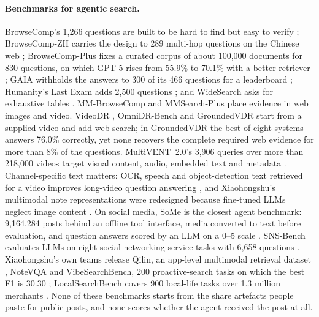 \documentclass[11pt]{article}
\begin{document}
\paragraph{Benchmarks for agentic search.}
BrowseComp's 1{,}266 questions are built to be hard to find but easy to verify \citep{wei2025browsecomp};
BrowseComp-ZH carries the design to 289 multi-hop questions on the Chinese web \citep{zhou2025browsecompzh};
BrowseComp-Plus fixes a curated corpus of about 100{,}000 documents for 830 questions, on which GPT-5 rises
from 55.9\% to 70.1\% with a better retriever \citep{chen2025browsecompplus}; GAIA withholds the answers to
300 of its 466 questions for a leaderboard \citep{mialon2023gaia}; Humanity's Last Exam adds 2{,}500
questions \citep{phan2025hle}; and WideSearch asks for exhaustive tables \citep{wong2025widesearch}.
MM-BrowseComp \citep{li2025mmbrowsecomp} and MMSearch-Plus \citep{tao2025mmsearchplus} place evidence in web
images and video. VideoDR \citep{liu2026videodr}, OmniDR-Bench \citep{meng2026omnidr} and GroundedVDR
\citep{liang2026groundedvdr} start from a supplied video and add web search; in GroundedVDR the best of eight
systems answers 76.0\% correctly, yet none recovers the complete required web evidence for more than 8\% of
the questions. MultiVENT~2.0's 3{,}906 queries over more than 218{,}000 videos target visual content, audio,
embedded text and metadata \citep{kriz2025multivent}. Channel-specific text matters: OCR, speech and object-detection text
retrieved for a video improves long-video question answering \citep{luo2025videorag}, and Xiaohongshu's
multimodal note representations were redesigned because fine-tuned LLMs neglect image content
\citep{zhang2025notellm2}. On social media, SoMe is the closest agent benchmark:
9{,}164{,}284 posts behind an offline tool interface, media converted to text before evaluation, and
question answers scored by an LLM on a 0--5 scale \citep{xue2026some}. SNS-Bench evaluates LLMs on eight
social-networking-service tasks with 6{,}658 questions \citep{guo2025snsbench}. Xiaohongshu's own teams
release Qilin, an app-level multimodal retrieval dataset \citep{chen2025qilin}, NoteVQA
\citep{jiang2026notevqa} and VibeSearchBench, 200 proactive-search tasks on which the best F1 is 30.30
\citep{xhs2026vibesearchbench}; LocalSearchBench covers 900 local-life tasks over 1.3 million merchants
\citep{he2026localsearchbench}. None of these benchmarks starts from the share artefacts people paste for
public posts, and none scores whether the agent received the post at all.
\end{document}
